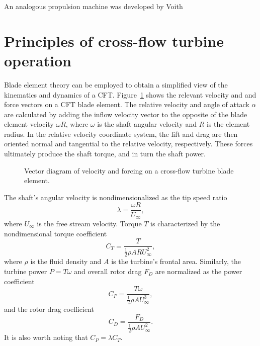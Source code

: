 


An analogous propulsion machine was developed by Voith


\section{Principles of cross-flow turbine operation}

Blade element theory can be employed to obtain a simplified view of the
kinematics and dynamics of a CFT. Figure~\ref{fig:vectors} shows the relevant
velocity and and force vectors on a CFT blade element. The relative velocity and
angle of attack $\alpha$ are calculated by adding the inflow velocity vector to
the opposite of the blade element velocity $\omega R$, where $\omega$ is the
shaft angular velocity and $R$ is the element radius. In the relative velocity
coordinate system, the lift and drag are then oriented normal and tangential to
the relative velocity, respectively. These forces ultimately produce the shaft
torque, and in turn the shaft power. 

\begin{figure}[ht]
    \centering
    
    \caption{Vector diagram of velocity and forcing on a cross-flow turbine
        blade element.}
    
    \label{fig:vectors}
\end{figure}

The shaft's angular velocity is nondimensionalized as the tip speed ratio
\begin{equation}
    \lambda = \frac{\omega R}{U_\infty},
    \label{eq:lambda}
\end{equation}
where $U_\infty$ is the free stream velocity.
Torque $T$ is characterized by the nondimensional torque coefficient 
\begin{equation}
    C_T = \frac{T}{\frac{1}{2} \rho A R U_\infty^2},
    \label{eq:ct}
\end{equation}
where $\rho$ is the fluid density and $A$ is the turbine's frontal area.
Similarly, the turbine power $P = T\omega$ and overall rotor drag $F_D$ are
normalized as the power coefficient
\begin{equation}
    C_P = \frac{T \omega}{\frac{1}{2} \rho A U_\infty^3},
    \label{eq:cp}
\end{equation}
and the rotor drag coefficient
\begin{equation}
    C_D = \frac{F_D}{\frac{1}{2} \rho A U_\infty^2}.
    \label{eq:cd}
\end{equation}
It is also worth noting that $C_P = \lambda C_T$.

